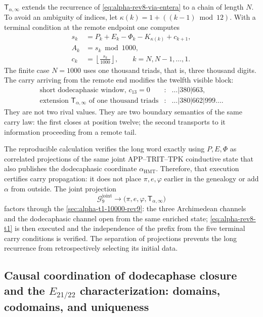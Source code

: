 \(\mathsf T_{\alpha,\infty}\) extends the recurrence of
\eqref{eq:alpha-rev8-via-entera} to a chain
of length \(N\). To avoid an ambiguity of indices, let
\(\kappa(k)=1+((k-1)\bmod12)\). With a terminal condition at the remote
endpoint one computes
\begin{equation}
\begin{aligned}
 s_k&=P_k+E_k-\Phi_k-K_{\kappa(k)}+c_{k+1},\\
 A_k&=s_k\bmod1000,\\
 c_k&=\left\lfloor\frac{s_k}{1000}\right\rfloor,
 \qquad k=N,N-1,\ldots,1.
\end{aligned}
\label{eq:alpha-rev8-t1}
\end{equation}
The finite case \(N=1000\) uses one thousand triads, that is, three thousand digits. The
carry arriving from the remote end modifies the twelfth
visible block:
\[
\begin{array}{rcl}
\text{short dodecaphasic window, }c_{13}=0
 &:& \ldots|380|663,\\
\text{extension }\mathsf T_{\alpha,\infty}\text{ of one thousand triads}
 &:& \ldots|380|662|999\ldots.
\end{array}
\]
They are not two rival values. They are two boundary semantics of the same
carry law: the first closes at position twelve; the second transports to
it information proceeding from a remote tail.

The reproducible calculation verifies the long word exactly using
\(P,E,\Phi\) as correlated projections of the same joint
APP--TRIT--TPK coinductive state that also publishes the dodecaphasic coordinate
\(\alpha_{\mathrm{HMT}}\). Therefore, that execution certifies carry
propagation: it does not place \(\pi,e,\varphi\) earlier in the genealogy or add
\(\alpha\) from outside. The joint projection
\[
 \mathcal G_9^{\mathrm{joint}}\longrightarrow
 \bigl(\pi,e,\varphi,\mathsf T_{\alpha,\infty}\bigr)
\]
factors through the \cref{sec:alpha-t1-10000-rev9}: the three
Archimedean channels and the dodecaphasic channel open from the same
enriched state; \eqref{eq:alpha-rev8-t1} is then executed and the
independence of the prefix from the five terminal carry
conditions is verified. The separation of projections prevents the long recurrence
from retrospectively selecting its initial data.

\subsection{Causal coordination of dodecaphase closure and the \texorpdfstring{\(E_{21/22}\)}{E21/22} characterization: domains, codomains, and uniqueness}

